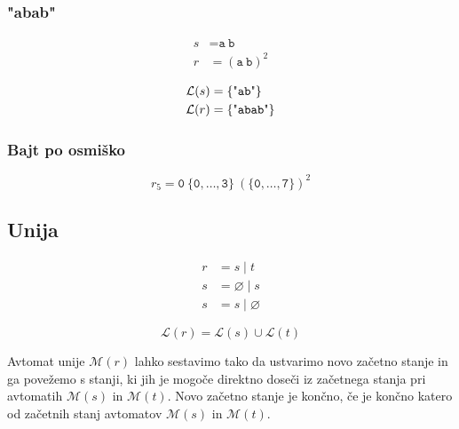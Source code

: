 \documentclass{article}
\newcommand{\Empty}{\varnothing}
\newcommand{\Language}[1]{\mathcal{L}(#1)}
\newcommand{\Automaton}[1]{\mathcal{M}(#1)}
\newcommand{\Str}[1]{\text{\textquotedbl\texttt{#1}\textquotedbl}}
\newcommand{\Char}[1]{\texttt{#1}}
\newcommand{\Seq}{\ }
\newcommand{\Union}{\mathrel{|}}
\begin{document}
\subsubsection{"abab"}

\begin{align*}
  s &= \Char{a} \Seq \Char{b} \\
  r &= (\Char{a} \Seq \Char{b})^2
\end{align*}

\begin{align*}
  \Language{s} &= \{\Str{ab}\} \\
  \Language{r} &= \{\Str{abab}\} \\
\end{align*}

\subsubsection{Bajt po osmiško}
\begin{equation*}
  r_5 = \Char{0} \Seq \{\Char{0}, \dots, \Char{3}\} \Seq (\{\Char{0}, \dots, \Char{7}\})^2
\end{equation*}

\subsection{Unija}
\begin{align*}
  r &= s \Union t \\
  s &= \Empty \Union s \\
  s &= s \Union \Empty
\end{align*}

\begin{equation*}
  \Language{r} = \Language{s} \cup \Language{t}
\end{equation*}

Avtomat unije $\Automaton{r}$ lahko sestavimo tako da ustvarimo novo začetno stanje in ga povežemo s stanji, ki jih je mogoče direktno doseči iz začetnega stanja pri avtomatih $\Automaton{s}$ in $\Automaton{t}$.
Novo začetno stanje je končno, če je končno katero od začetnih stanj avtomatov $\Automaton{s}$ in $\Automaton{t}$.
\end{document}
